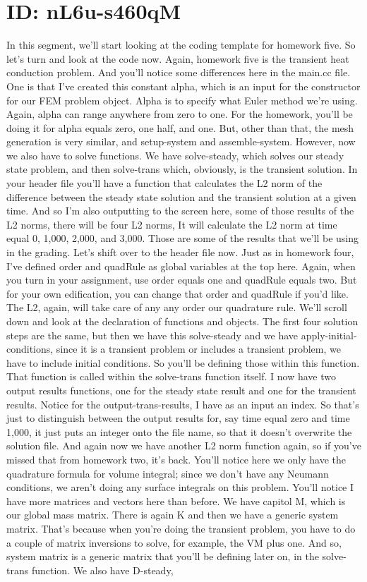 \documentclass[10pt]{article}
\begin{document}
\section*{ID: nL6u-s460qM}
In this segment, we'll start looking at the coding template for homework five. So let's turn and look at the code now. Again, homework five is the transient heat conduction problem. And you'll notice some differences here in the main.cc file. One is that I've created this constant alpha, which is an input for the constructor for our FEM problem object. Alpha is to specify what Euler method we're using. Again, alpha can range anywhere from zero to one. For the homework, you'll be doing it for alpha equals zero, one half, and one. But, other than that, the mesh generation is very similar, and setup-system and assemble-system. However, now we also have to solve functions. We have solve-steady, which solves our steady state problem, and then solve-trans which, obviously, is the transient solution. In your header file you'll have a function that calculates the L2 norm of the difference between the steady state solution and the transient solution at a given time. And so I'm also outputting to the screen here, some of those results of the L2 norms, there will be four L2 norms, It will calculate the L2 norm at time equal 0, 1,000, 2,000, and 3,000. Those are some of the results that we'll be using in the grading. Let's shift over to the header file now. Just as in homework four, I've defined order and quadRule as global variables at the top here. Again, when you turn in your assignment, use order equals one and quadRule equals two. But for your own edification, you can  change that order and quadRule if you'd like. The L2, again, will take care of any any order our quadrature rule. We'll scroll down and look at the declaration of functions and objects. The first four solution steps are the same, but then we have this solve-steady and we have apply-initial-conditions, since it is a transient problem or includes a transient problem, we have to include initial conditions. So you'll be defining those within this function. That function is called within the solve-trans function itself. I now have two output results functions, one for the steady state result and one for the transient results. Notice for the output-trans-results, I have as an input an index. So that's just to distinguish between the output results for, say time equal zero and time 1,000, it just puts an integer onto the file name, so that it doesn't overwrite the solution file. And again now we have another L2 norm function again, so if you've missed that from homework two, it's back. You'll notice here we only have the quadrature formula for volume integral; since we don't have any Neumann conditions, we aren't doing any surface integrals on this problem. You'll notice I have more matrices and vectors here than before. We have capitol M, which is our global mass matrix. There is again K and then we have a generic system matrix. That's because when you're doing the transient problem, you have to do a couple of matrix inversions to solve, for example, the VM plus one. And so, system matrix is a generic matrix that you'll be defining later on, in the solve-trans function. We also have D-steady, 
\end{document}
